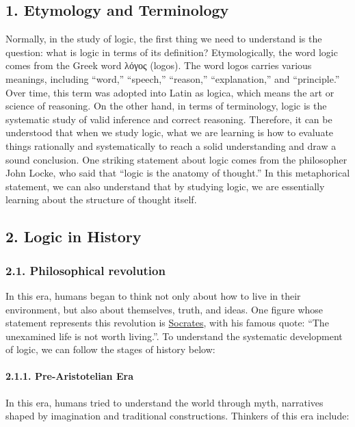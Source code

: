 
\subsection{1. Etymology and
Terminology}\label{etymology-and-terminology}

Normally, in the study of logic, the first thing we need to understand
is the question: what is logic in terms of its definition?
Etymologically, the word logic comes from the Greek word λόγος (logos).
The word logos carries various meanings, including ``word,'' ``speech,''
``reason,'' ``explanation,'' and ``principle.'' Over time, this term was
adopted into Latin as logica, which means the art or science of
reasoning. On the other hand, in terms of terminology, logic is the
systematic study of valid inference and correct reasoning. Therefore, it
can be understood that when we study logic, what we are learning is how
to evaluate things rationally and systematically to reach a solid
understanding and draw a sound conclusion. One striking statement about
logic comes from the philosopher John Locke, who said that ``logic is
the anatomy of thought.'' In this metaphorical statement, we can also
understand that by studying logic, we are essentially learning about the
structure of thought itself.

\subsection{2. Logic in History}\label{logic-in-history}

\subsubsection{2.1. Philosophical
revolution}\label{philosophical-revolution}

In this era, humans began to think not only about how to live in their
environment, but also about themselves, truth, and ideas. One figure
whose statement represents this revolution is
\href{https://en.wikipedia.org/wiki/Socrates}{Socrates}, with his famous
quote: ``The unexamined life is not worth living.''. To understand the
systematic development of logic, we can follow the stages of history
below:

\paragraph{2.1.1. Pre-Aristotelian Era}\label{pre-aristotelian-era}

In this era, humans tried to understand the world through myth,
narratives shaped by imagination and traditional constructions. Thinkers
of this era include:

